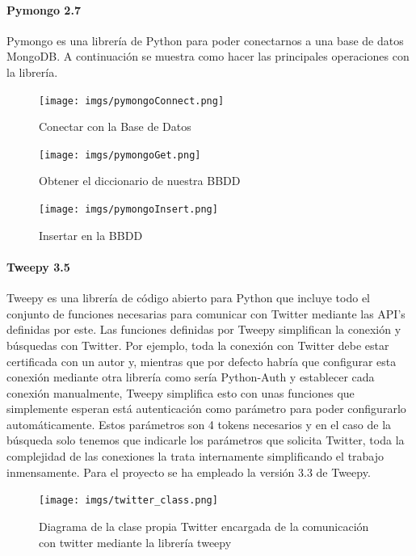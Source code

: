 \documentclass[../all.tex]{subfiles}
\begin{document}
       	\paragraph{Pymongo 2.7}
       		Pymongo es una librería de Python para poder conectarnos a una base de datos MongoDB. A continuación se muestra como hacer las principales operaciones con la librería.\\
       		\begin{figure}[H]
       			\centering
       			\texttt{[image: imgs/pymongoConnect.png]}
       			\caption{Conectar con la Base de Datos}
       		\end{figure}
	       	\begin{figure}[H]
	       		\centering
	       		\texttt{[image: imgs/pymongoGet.png]}
	       		\caption{Obtener el diccionario de nuestra BBDD}
	       	\end{figure}
	       \begin{figure}[H]
	       	\centering
	       	\texttt{[image: imgs/pymongoInsert.png]}
	       	\caption{Insertar en la BBDD}
	       \end{figure}
       
       \newpage
       \paragraph{Tweepy 3.5}
            Tweepy es una librería de código abierto para Python que incluye todo el conjunto de funciones necesarias para comunicar con Twitter mediante las API's definidas por este. Las funciones definidas por Tweepy simplifican la conexión y búsquedas con Twitter. Por ejemplo, toda la conexión con Twitter debe estar certificada con un autor y, mientras que por defecto habría que configurar esta conexión mediante otra librería como sería Python-Auth y establecer cada conexión manualmente, Tweepy simplifica esto con unas funciones que simplemente esperan está autenticación como parámetro para poder configurarlo automáticamente. Estos parámetros son 4 tokens necesarios y en el caso de la búsqueda solo tenemos que indicarle los parámetros que solicita Twitter, toda la complejidad de las conexiones la trata internamente simplificando el trabajo inmensamente. Para el proyecto se ha empleado la versión 3.3 de Tweepy.
            \begin{figure}[H]
            	\centering
            	\texttt{[image: imgs/twitter\_class.png]}
            	\caption{Diagrama de la clase propia Twitter encargada de la comunicación con twitter mediante la librería tweepy}
            \end{figure}
        
\end{document}
